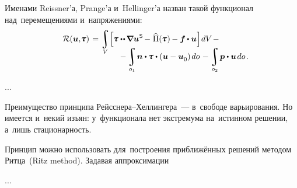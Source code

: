 \begin{otherlanguage}{russian}
\noindent
Именами Reissner’а, Prange’а и~Hellinger’а назван такой функционал над~перемещениями и~напряжениями: %
\begin{multline}\label{reissnerhellingervariationalprinciple}
\shoveleft{\displaystyle \mathcal{R}(\bm{u}, \hspace{-0.32ex}\mathboldtau) \hspace{0.2ex} =
\integral\displaylimits_V \hspace{-0.4ex}
\left[^{\mathstrut} \hspace{-0.2ex}
\mathboldtau \dotdotp \hspace{-0.16ex} \boldnabla {\bm{u}}^{\hspace{0.08ex}\mathsf{S}} \hspace{-0.2ex} - \hspace{0.1ex} \widehat{\Pi}(\hspace{-0.1ex}\mathboldtau\hspace{0.05ex})\hspace{-0.1ex} -
\bm{f} \hspace{-0.1ex} \dotp \bm{u}
\hspace{0.1ex} \right] \hspace{-0.25ex} dV \hspace{0.2ex} - \hfill} \\[-1.2em]
%
\hspace{8em} \displaystyle - \integral\displaylimits_{o_1} \hspace{-0.25ex} \bm{n} \dotp \hspace{-0.1ex} \mathboldtau \dotp \left( \bm{u} - \bm{u}_{\raisemath{-0.1em}{0}} \right) \hspace{-0.1ex} do \hspace{0.2ex} -
\integral\displaylimits_{o_2} \hspace{-0.2ex} \bm{p} \dotp \bm{u} \hspace{0.25ex} do \hspace{0.2ex}.
\end{multline}


...


Преимущество принципа Рейсснера\hbox{--}Хеллингера~--- в~свободе варьирования. Но имеется и~некий изъян: у~функционала нет экстремума на~истинном решении, а~лишь стационарность.

Принцип можно использовать для~построения приближённых решений методом Ритца~(Ritz method). Задавая аппроксимации


...



\end{otherlanguage}

